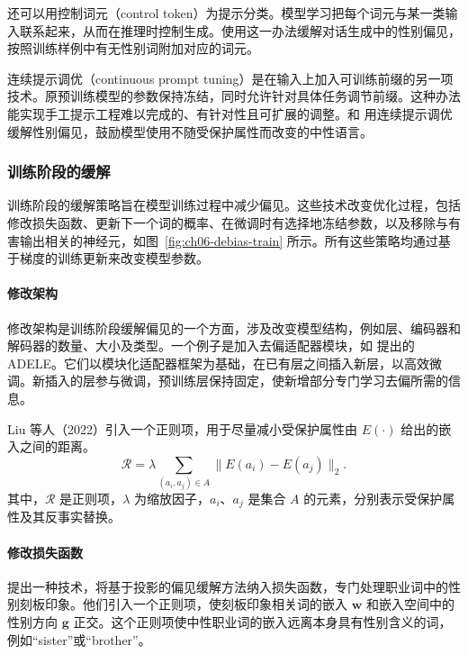 还可以用控制词元（control token）为提示分类。模型学习把每个词元与某一类输入联系起来，从而在推理时控制生成。使用这一办法缓解对话生成中的性别偏见，按照训练样例中有无性别词附加对应的词元。

\begin{practicaltip}
连续提示调优（continuous prompt tuning）是在输入上加入可训练前缀的另一项技术。原预训练模型的参数保持冻结，同时允许针对具体任务调节前缀。这种办法能实现手工提示工程难以完成的、有针对性且可扩展的调整。和 用连续提示调优缓解性别偏见，鼓励模型使用不随受保护属性而改变的中性语言。
\end{practicaltip}

\subsubsection{训练阶段的缓解}
训练阶段的缓解策略旨在模型训练过程中减少偏见。这些技术改变优化过程，包括修改损失函数、更新下一个词的概率、在微调时有选择地冻结参数，以及移除与有害输出相关的神经元，如图~\ref{fig:ch06-debias-train} 所示。所有这些策略均通过基于梯度的训练更新来改变模型参数。


\paragraph*{修改架构}
修改架构是训练阶段缓解偏见的一个方面，涉及改变模型结构，例如层、编码器和解码器的数量、大小及类型。一个例子是加入去偏适配器模块，如 提出的 ADELE。它们以模块化适配器框架为基础，在已有层之间插入新层，以高效微调。新插入的层参与微调，预训练层保持固定，使新增部分专门学习去偏所需的信息。

Liu 等人（2022）引入一个正则项，用于尽量减小受保护属性由 $E(\cdot)$ 给出的嵌入之间的距离。
\begin{equation}
\mathcal{R}=\lambda\sum_{(a_i,a_j)\in A}\lVert E(a_i)-E(a_j)\rVert_2.
\label{eq:ch06-embedding-regularization}
\end{equation}
其中，$\mathcal{R}$ 是正则项，$\lambda$ 为缩放因子，$a_i$、$a_j$ 是集合 $A$ 的元素，分别表示受保护属性及其反事实替换。

\paragraph*{修改损失函数}
提出一种技术，将基于投影的偏见缓解方法纳入损失函数，专门处理职业词中的性别刻板印象。他们引入一个正则项，使刻板印象相关词的嵌入 $\symbf{w}$ 和嵌入空间中的性别方向 $\symbf{g}$ 正交。这个正则项使中性职业词的嵌入远离本身具有性别含义的词，例如“sister”或“brother”。

